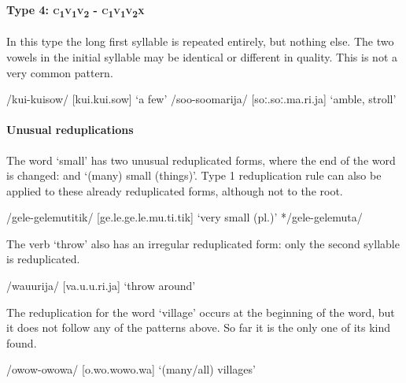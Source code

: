 \paragraph{Type 4:  \textsc{c}\textsubscript{1}\textsc{v}\textsubscript{1}\textsc{v}\textsubscript{2} - \textsc{c}\textsubscript{1}\textsc{v}\textsubscript{1}\textsc{v}\textsubscript{2}\textsc{x}}\label{sec:2:a:z:y:x}

In this type the long first syllable is repeated entirely, but nothing else.  The two vowels in the initial syllable may be identical or different in quality. This is not a very common pattern.

\ea
\ea
/kui-kuisow/  [{{\textprimstress}}kui.{{\textprimstress}}{{\textprimstress}}kui.sow]  `a few'
\ex
/soo-soomarija/  [{{\textprimstress}}soː.{{\textprimstress}}{{\textprimstress}}soː.ma.ri.ja]  `amble, stroll'
\z
\z

\paragraph{Unusual reduplications}\label{sec:2:a:z:y:x}

The word  `small' has two unusual reduplicated forms, where the end of the word is changed:  and  `(many) small (things)'.  Type 1 reduplication rule can also be applied to these already reduplicated forms, although not to the root.

\ea
\ea
/gele-gelemutitik/  [ge.{{\textprimstress}}le.ge.{{\textprimstress}}{{\textprimstress}}le.mu.ti.tik]  `very small (pl.)'
\ex
*/gele-gelemuta/
\z
\z

The verb  `throw' also has an irregular reduplicated form: only the second syllable is reduplicated.

\ea
/wa{\textphi}u{\textphi}urija/  [va.{{\textprimstress}}{\textphi}u.{\textphi}u.ri.ja]  `throw around'
\z

The reduplication for the word  `village' occurs at the beginning of the word, but it does not follow any of the patterns above. So far it is the only one of its kind found.

\ea
/owow-owowa/  [o.{{\textprimstress}}wo.wo{{\textprimstress}}{{\textprimstress}}wo.wa]  `(many/all) villages'
\z

